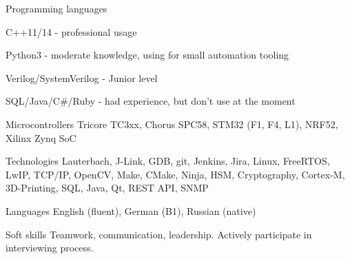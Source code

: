 


\begin{cvskills}


\cvskill
{Programming languages} %
{
    \begin{cvitems}
    \item{C++11/14 - professional usage}
    \item{Python3 - moderate knowledge, using for small automation tooling}
    \item{Verilog/SystemVerilog - Junior level}
    \item{SQL/Java/C\#/Ruby - had experience, but don't use at the moment}
    \newline
    \end{cvitems}
} %

\newline


\cvskill
{Microcontrollers} %
{Tricore TC3xx, Chorus SPC58, STM32 (F1, F4, L1), NRF52, Xilinx Zynq SoC} %

\newline

\cvskill
{Technologies} %
{Lauterbach, J-Link, GDB, git, Jenkins, Jira, Linux, FreeRTOS, LwIP, TCP/IP, OpenCV, Make, CMake, Ninja,
HSM, Cryptography, Cortex-M, 3D-Printing, SQL, Java, Qt, REST API, SNMP} %

\newline

\cvskill
{Languages} %
{ English (fluent), German (B1), Russian (native)} %


\cvskill
{Soft skills} %
{ Teamwork, communication, leadership. Actively participate in interviewing process. } %


\end{cvskills}